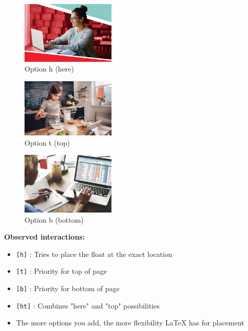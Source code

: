 \documentclass{article}
\begin{document}
\lipsum[1-2]

\begin{figure}[h]
    \centering
    \includegraphics[width=0.4\textwidth]{example-image-a}
    \caption{Option h (here)}
    \label{fig:h}
\end{figure}

\lipsum[3]
\begin{figure}[t]
    \centering
    \includegraphics[width=0.4\textwidth]{example-image-b}
    \caption{Option t (top)}
    \label{fig:t}
\end{figure}

\begin{figure}[b]
    \centering
    \includegraphics[width=0.4\textwidth]{example-image-c}
    \caption{Option b (bottom)}
    \label{fig:b}
\end{figure}

\lipsum[4-8]
\textbf{Observed interactions:}
\begin{itemize}
\item \texttt{[h]} : Tries to place the float at the exact location
\item \texttt{[t]} : Priority for top of page
\item \texttt{[b]} : Priority for bottom of page
\item \texttt{[ht]} : Combines "here" and "top" possibilities
\item The more options you add, the more flexibility LaTeX has for placement
\end{itemize}
\end{document}
